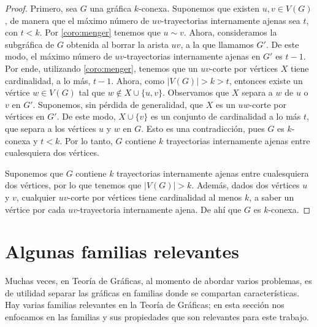  \begin{proof}
     Primero, sea $G$ una gr\'afica $k$-conexa. Suponemos que existen $u,v \in
     V(G)$, de manera que el m\'aximo n\'umero de $uv$-trayectorias internamente
     ajenas sea $t$, con $t<k$. Por \cref{coro:menger} tenemos que $u \sim v$.
     Ahora, consideramos la subgr\'afica de $G$ obtenida al borrar la arista
     $uv$, a la que llamamos $G'$. De este modo, el m\'aximo n\'umero de
     $uv$-trayectorias internamente ajenas en $G'$ es $t-1$. Por ende,
     utilizando \cref{coro:menger}, tenemos que un $uv$-corte por v\'ertices $X$
     tiene cardinalidad, a lo m\'as, $t-1$. Ahora, como $|V(G)| > k > t$,
     entonces existe un v\'ertice $w \in V(G)$ tal que $w \notin X\cup\{u,v\}$.
     Observamos que $X$ separa a $w$ de $u$ o $v$ en $G'$. Suponemos, sin
     p\'erdida de generalidad, que $X$ es un $uw$-corte por v\'ertices en $G'$.
     De este modo, $X\cup\{v\}$ es un conjunto de cardinalidad a lo m\'as $t$,
     que separa a los v\'ertices $u$ y $w$ en $G$. Esto es una contradicci\'on,
     pues $G$ es $k$-conexa y $t < k$. Por lo tanto, $G$ contiene $k$
     trayectorias internamente ajenas entre cualesquiera dos v\'ertices.
 
     Suponemos que $G$ contiene $k$ trayectorias internamente ajenas
     entre cualesquiera dos v\'ertices, por lo que tenemos que $|V(G)|>k$.
     Adem\'as, dados dos v\'ertices $u$ y $v$, cualquier $uv$-corte por
     v\'ertices tiene cardinalidad al menos $k$, a saber un v\'ertice por cada
     $uv$-trayectoria internamente ajena. De ah\'i que $G$ es $k$-conexa.
         
 \end{proof}



\section{Algunas familias relevantes}
\label{sec:famGraf}
   
Muchas veces, en Teor\'ia de Gr\'aficas, al momento de abordar varios problemas,
es de utilidad separar las gr\'aficas en familias donde se compartan
caracter\'isticas. Hay varias familias relevantes en la Teor\'ia de Gr\'aficas;
en esta secci\'on nos enfocamos en las familias y sus propiedades que son
relevantes para este trabajo.

